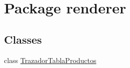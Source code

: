 \hypertarget{namespacerenderer}{}\section{Package renderer}
\label{namespacerenderer}
\subsection*{Classes}
\begin{DoxyCompactItemize}
\item 
class \mbox{\hyperlink{classrenderer_1_1_trazador_tabla_productos}{Trazador\+Tabla\+Productos}}
\end{DoxyCompactItemize}
